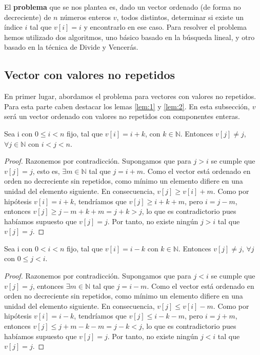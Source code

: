 El \textbf{problema} que se nos plantea es, dado un vector ordenado (de forma no decreciente) de $n$ números enteros $v$, todos 
distintos, determinar si existe un índice $i$ tal que $v[i] = i$ y 
encontrarlo en ese caso. Para resolver el problema hemos utilizado dos algoritmos, uno básico basado en 
la búsqueda lineal, y otro basado en la técnica de Divide y Vencerás. 

\subsection{Vector con valores no repetidos}

En primer lugar, abordamos el problema para vectores con valores no repetidos. Para esta parte
caben destacar los lemas \ref{lem:1} y \ref{lem:2}. En esta subsección, $v$ será un vector ordenado con
valores no repetidos con componentes enteras. 

\begin{lemma}
    \label{lem:1}
    Sea i con $0 \leqslant i < n$ fijo, tal que $v[i]=i+k$, con $k \in \mathbb N$. 
    Entonces $v[j] \neq j$, $\forall j \in \mathbb N$ con $i < j < n$. 
\end{lemma}

\begin{proof}
    Razonemos por contradicción. Supongamos que para $j > i$ se 
    cumple que $v[j]=j$, esto es, $\exists m \in \mathbb N$ tal que $j=i+m$. Como el 
    vector está ordenado en orden no decreciente sin repetidos, como mínimo un elemento
    difiere en una unidad del elemento siguiente. En consecuencia,  $v[j] \geq v[i]+m$. 
    Como por hipótesis $v[i]=i+k$, tendríamos que $v[j] \geq i+k+m$, pero $i=j-m$, entonces 
    $v[j] \geq j-m+k+m=j+k > j$, lo que es contradictorio pues habíamos supuesto que $v[j]=j$. Por tanto, no 
    existe ningún $j > i$ tal que $v[j]=j$.
\end{proof}

\begin{lemma}
    \label{lem:2}
    Sea i con $0 < i < n$ fijo, tal que $v[i]=i-k$ con 
    $k \in \mathbb N$. Entonces $v[j] \neq j$,  $\forall j$ con $0 \leqslant j < i$. 
\end{lemma}

\begin{proof}
    Razonemos por contradicción. Supongamos que para $j < i$ se 
    cumple que $v[j]=j$, entonces $\exists m \in \mathbb N$ tal que $j=i-m$. Como el 
    vector está ordenado en orden no decreciente sin repetidos, como mínimo un elemento
    difiere en una unidad del elemento siguiente. En consecuencia,  $v[j] \leq v[i]-m$. 
    Como por hipótesis $v[i]=i-k$, tendríamos que $v[j] \leq i-k-m$, pero $i=j+m$, entonces 
    $v[j] \leq j+m-k-m=j-k < j$, lo que es contradictorio pues habíamos supuesto que $v[j]=j$. Por tanto, no 
    existe ningún $j<i$ tal que $v[j]=j$.
\end{proof}

